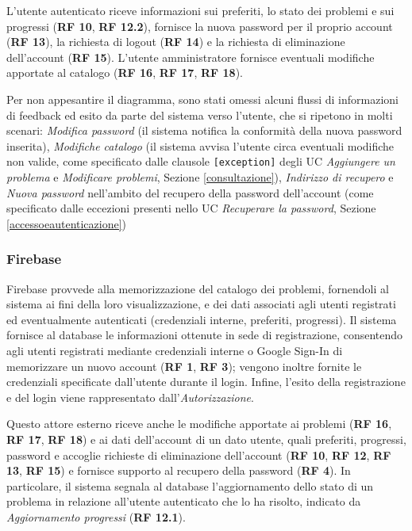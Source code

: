 \documentclass[11pt, a4paper]{article}
\theoremstyle{definition} %
\begin{document}
L'utente autenticato riceve informazioni sui preferiti, lo stato dei problemi
e sui progressi (\textbf{RF 10}, \textbf{RF 12.2}), fornisce la nuova password
per il proprio account (\textbf{RF 13}), la richiesta di logout (\textbf{RF 14})
e la richiesta di eliminazione dell'account (\textbf{RF 15}).
L'utente amministratore fornisce eventuali modifiche apportate al catalogo
(\textbf{RF 16}, \textbf{RF 17}, \textbf{RF 18}).

Per non appesantire il diagramma, sono stati omessi alcuni flussi di informazioni
di feedback ed esito da parte del sistema verso l'utente, che si ripetono in molti
scenari: \textit{Modifica password} (il sistema notifica la conformità della
nuova password inserita), \textit{Modifiche catalogo} (il sistema avvisa l'utente
circa eventuali modifiche non valide, come specificato dalle clausole
\texttt{[exception]} degli UC \textit{Aggiungere un problema} e \textit{Modificare
problemi}, Sezione \ref{consultazione}), \textit{Indirizzo di recupero} e
\textit{Nuova password} nell'ambito del recupero della password dell'account
(come specificato dalle eccezioni presenti nello UC \textit{Recuperare la
password}, Sezione \ref{accessoeautenticazione})

\subsubsection*{Firebase}
Firebase provvede alla memorizzazione del catalogo dei problemi, fornendoli
al sistema ai fini della loro visualizzazione, e dei dati associati agli utenti
registrati ed eventualmente autenticati (credenziali interne, preferiti,
progressi). Il sistema fornisce al database le informazioni ottenute in sede
di registrazione, consentendo agli utenti registrati mediante credenziali
interne o Google Sign-In di memorizzare un nuovo account (\textbf{RF 1},
\textbf{RF 3}); vengono inoltre fornite le credenziali specificate
dall'utente durante il login. Infine, l'esito della registrazione e del
login viene rappresentato dall'\textit{Autorizzazione}.

Questo attore esterno riceve anche le modifiche apportate
ai problemi (\textbf{RF 16}, \textbf{RF 17}, \textbf{RF 18}) e ai dati
dell'account di un dato utente, quali preferiti, progressi, password e
accoglie richieste di eliminazione dell'account (\textbf{RF 10}, \textbf{RF 12},
\textbf{RF 13}, \textbf{RF 15}) e fornisce supporto al recupero della password (\textbf{RF 4}). In particolare, il sistema segnala al database
l'aggiornamento dello stato di un problema in relazione all'utente autenticato
che lo ha risolto, indicato da \textit{Aggiornamento progressi}
(\textbf{RF 12.1}).
\end{document}

